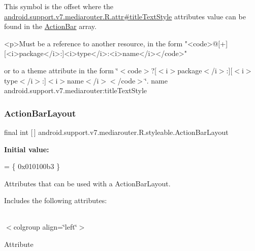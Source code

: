 This symbol is the offset where the \hyperlink{classandroid_1_1support_1_1v7_1_1mediarouter_1_1R_1_1attr_af0515fea4fdf16c1b914b839db3e8168}{android.\+support.\+v7.\+mediarouter.\+R.\+attr\#title\+Text\+Style} attribute\textquotesingle{}s value can be found in the \hyperlink{classandroid_1_1support_1_1v7_1_1mediarouter_1_1R_1_1styleable_adc4d3c0d096085367f12d025007aa53f}{Action\+Bar} array.

\begin{DoxyVerb}      <p>Must be a reference to another resource, in the form "<code>@[+][<i>package</i>:]<i>type</i>:<i>name</i></code>"
\end{DoxyVerb}
 or to a theme attribute in the form \char`\"{}$<$code$>$?\mbox{[}$<$i$>$package$<$/i$>$\+:\mbox{]}\mbox{[}$<$i$>$type$<$/i$>$\+:\mbox{]}$<$i$>$name$<$/i$>$$<$/code$>$\char`\"{}.  name android.\+support.\+v7.\+mediarouter\+:title\+Text\+Style \mbox{\label{classandroid_1_1support_1_1v7_1_1mediarouter_1_1R_1_1styleable_a72c952cc46b5b0c06758878f540fe729}} 
\subsubsection{\texorpdfstring{Action\+Bar\+Layout}{ActionBarLayout}}
{\footnotesize\ttfamily final int \mbox{[}$\,$\mbox{]} android.\+support.\+v7.\+mediarouter.\+R.\+styleable.\+Action\+Bar\+Layout\hspace{0.3cm}{\ttfamily [static]}}

{\bfseries Initial value\+:}
\begin{DoxyCode}
= \{
            0x010100b3
        \}
\end{DoxyCode}
Attributes that can be used with a Action\+Bar\+Layout. 

Includes the following attributes\+:

\tabulinesep=1mm
\begin{longtabu} spread 0pt [c]{*{0}{|X[-1]}|}
\hline
\end{longtabu}
$<$colgroup align=\char`\"{}left\char`\"{}$>$ 

Attribute

